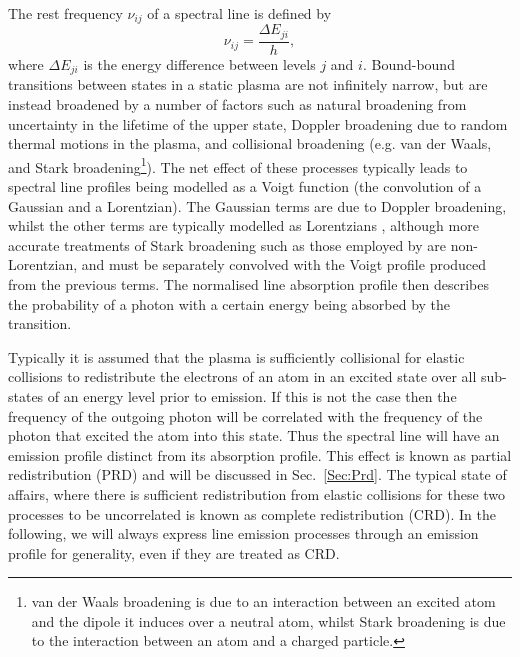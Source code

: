 The rest frequency $\nu_{ij}$ of a spectral line is defined by
\begin{equation}
    \nu_{ij} = \frac{\Delta E_{ji}}{h},
\end{equation}
where $\Delta E_{ji}$ is the energy difference between levels $j$ and $i$.
Bound-bound transitions between states in a static plasma are not infinitely narrow, but are instead broadened by a number of factors such as natural broadening from uncertainty in the lifetime of the upper state, Doppler broadening due to random thermal motions in the plasma, and collisional broadening (e.g. van der Waals, and Stark broadening\footnote{van der Waals broadening is due to an interaction between an excited atom and the dipole it induces over a neutral atom, whilst Stark broadening is due to the interaction between an atom and a charged particle.}). %
The net effect of these processes typically leads to spectral line profiles being modelled as a Voigt function (the convolution of a Gaussian and a Lorentzian).
The Gaussian terms are due to Doppler broadening, whilst the other terms are typically modelled as Lorentzians \citep[e.g.][]{Sutton1978}, although more accurate treatments of Stark broadening such as those employed by \citet{Kowalski2017} are non-Lorentzian, and must be separately convolved with the Voigt profile produced from the previous terms.
The normalised line absorption profile then describes the probability of a photon with a certain energy being absorbed by the transition.

Typically it is assumed that the plasma is sufficiently collisional for elastic collisions to redistribute the electrons of an atom in an excited state over all sub-states of an energy level prior to emission.
If this is not the case then the frequency of the outgoing photon will be correlated with the frequency of the photon that excited the atom into this state.
Thus the spectral line will have an emission profile distinct from its absorption profile.
This effect is known as partial  redistribution (PRD) and will be discussed in Sec.~\ref{Sec:Prd}.
The typical state of affairs, where there is sufficient redistribution from elastic collisions for these two processes to be uncorrelated is known as complete redistribution (CRD).
In the following, we will always express line emission processes through an emission profile for generality, even if they are treated as CRD.

